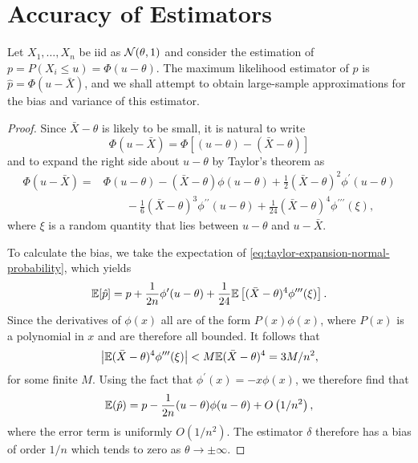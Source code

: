 \section{Accuracy of Estimators}

\begin{example}
	Let $X_{1},\ldots,X_{n}$ be iid as ${\mathcal N}(\theta,1)$ and consider the estimation of $p=P\left(X_{i}\leq u\right)=\Phi(u-\theta)$. The maximum likelihood estimator of $p$ is $\hat{p}=\Phi(u-\bar{X})$, and we shall attempt to obtain large-sample approximations for the bias and variance of this estimator.
\end{example}

\begin{proof}
	Since $\bar{X}-\theta$ is likely to be small, it is natural to write
	\begin{equation*}
		\Phi(u-\bar{X})=\Phi[(u-\theta)-(\bar{X}-\theta)]
	\end{equation*}
	and to expand the right side about $u-\theta$ by Taylor's theorem as
	\begin{equation}
		\label{eq:taylor-expansion-normal-probability}
		\begin{aligned}
			\Phi(u-\bar{X})= & \Phi(u-\theta)-(\bar{X}-\theta)\phi(u-\theta)+\frac{1}{2}(\bar{X}-\theta)^{2}\phi^{\prime}(u-\theta)                                  \\
			                 & \qquad -\frac{1}{6}(\bar{X}-\theta)^{3}\phi^{\prime\prime}(u-\theta)+\frac{1}{24}(\bar{X}-\theta)^{4}\phi^{\prime\prime \prime}(\xi),
		\end{aligned}
	\end{equation}
	where $\xi$ is a random quantity that lies between $u-\theta$ and $u-\bar{X}$.

	To calculate the bias, we take the expectation of \eqref{eq:taylor-expansion-normal-probability}, which yields
	\begin{equation*}
		{\mathbb E}[\hat{p}]=p+\frac{1}{2n}\phi^{\prime}(u-\theta)+\frac{1}{24}{\mathbb E}\left[(\bar{X}-\theta)^4\phi^{\prime\prime\prime}(\xi)\right].
	\end{equation*}
	Since the derivatives of $\phi(x)$ all are of the form $P(x)\phi(x)$, where $P(x)$ is a polynomial in $x$ and are therefore all bounded. It follows that
	\begin{equation*}
		\left|{\mathbb E}(\bar{X}-\theta)^{4}\phi^{\prime\prime\prime}(\xi)\right|<M{\mathbb E}(\bar{X}-\theta)^{4}=3M/n^2,
	\end{equation*}
	for some finite $M$. Using the fact that $\phi^{\prime}(x)=-x \phi(x)$, we therefore find that
	\begin{equation*}
		{\mathbb E}(\hat{p})=p-\frac{1}{2n}(u-\theta)\phi(u-\theta)+O\left(1/n^{2}\right),
	\end{equation*}
	where the error term is uniformly $O\left(1 / n^2\right)$.
	The estimator $\delta$ therefore has a bias of order $1/n$ which tends to zero as $\theta \rightarrow \pm \infty$.


\end{proof}
